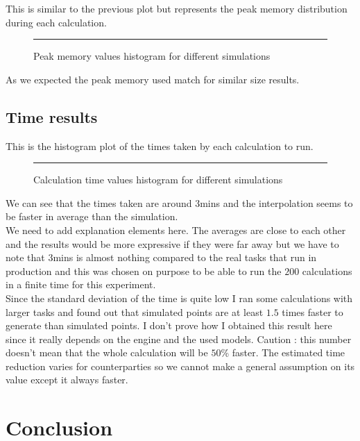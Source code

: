 \documentclass{article}
\begin{document}
This is similar to the previous plot but represents the peak memory distribution during each calculation.

\begin{figure}[H]
    \centering
    \rule{0.8\textwidth}{0.35\textheight} %
    \caption{Peak memory values histogram for different simulations}
\end{figure}

As we expected the peak memory used match for similar size results.

\subsection{Time results}

This is the histogram plot of the times taken by each calculation to run.

\begin{figure}[H]
    \centering
    \rule{0.8\textwidth}{0.35\textheight} %
    \caption{Calculation time values histogram for different simulations}
\end{figure}

We can see that the times taken are around 3mins and the interpolation seems to be faster in average than the simulation.\\

We need to add explanation elements here. The averages are close to each other and the results would be more expressive if they were far away but we have to note that 3mins is almost nothing compared to the real tasks that run in production and this was chosen on purpose to be able to run the $200$ calculations in a finite time for this experiment.\\

Since the standard deviation of the time is quite low I ran some calculations with larger tasks and found out that simulated points are at least $1.5$ times faster to generate than simulated points. I don't prove how I obtained this result here since it really depends on the engine and the used models. Caution : this number doesn't mean that the whole calculation will be $50$\% faster. The estimated time reduction varies for counterparties so we cannot make a general assumption on its value except it always faster.

\section{Conclusion}
\end{document}
